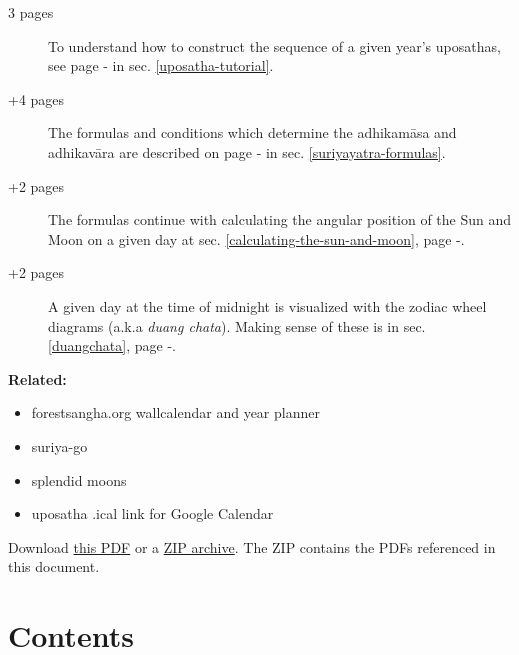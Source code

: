 \documentclass[11pt,oneside]{memoir-article}
\begin{document}
\begin{description}
\item[{3 pages}] To understand how to construct the sequence of a given year's uposathas, see
page \pageref{uposatha-tutorial}-\pageref{uposatha-tutorial-end}
in sec. \ref{uposatha-tutorial}.
\item[{+4 pages}] The formulas and conditions which determine the adhikamāsa and
adhikavāra are described on page \pageref{suriyayatra-formulas}-\pageref{adhikavara-years-end} in
sec. \ref{suriyayatra-formulas}.
\item[{+2 pages}] The formulas continue with calculating the angular position
of the Sun and Moon on a given day at sec. \ref{calculating-the-sun-and-moon}, page
\pageref{calculating-the-sun-and-moon}-\pageref{calculating-the-sun-and-moon-end}.
\item[{+2 pages}] A given day at the time of midnight is visualized with the zodiac
wheel diagrams (a.k.a \emph{duang chata}). Making sense of these is in sec. \ref{duangchata},
page \pageref{duangchata}-\pageref{duangchata-end}.
\end{description}

{\centering\large\bfseries
Related:
\par}

\begin{itemize}
\item forestsangha.org wallcalendar and year planner
\item suriya-go
\item splendid moons
\item uposatha .ical link for Google Calendar
\end{itemize}

Download \href{https://github.com/profound-labs/calculating-the-uposatha-moondays/raw/master/calculating-the-uposatha-moondays.pdf}{this PDF} or a \href{https://github.com/profound-labs/calculating-the-uposatha-moondays/archive/master.zip}{ZIP archive}. The ZIP contains the PDFs referenced in this document.

%
%

\clearpage

\chapter{Contents}
\label{sec-1}
\end{document}
